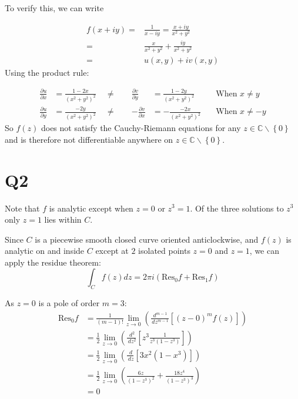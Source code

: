 \documentclass[a4paper, 11pt]{article}
\newcommand{\CC}{\mathbb{C}}
\def\set#1{\left\{ #1 \right\}}
\def\pp#1#2{\frac{\partial #1}{\partial #2}}
\def\dd#1#2{\frac{\,d#1}{\,d#2}}
\begin{document}
\begin{multicols}{2}
	To verify this, we can write

	\begin{align*}
		f(x+iy) = & \frac{1}{x-iy}
		=\frac{x+iy}{x^2+y^2}                           \\
		=         & \frac x{x^2+y^2}+\frac{iy}{x^2+y^2} \\
		=         & u(x,y)+iv(x,y)
	\end{align*}
	Using the product rule:

	\begin{alignat*}{6}
		\pp{u}{x}  & = \frac{1-2x}{(x^2+y^2)^2}      & \;\;\neq\;\;           &  &
		\pp{v}{y}  & = \frac{1-2y}{(x^2+y^2)^2}\quad & \text{When $x\neq y$}       \\
		\pp{u}{y}  & = \frac{-2y}{(x^2+y^2)^2}       & \;\;\neq\;\;           &  &
		-\pp{v}{x} & = -\frac{-2x}{(x^2+y^2)^2}\quad & \text{When $x\neq -y$}
	\end{alignat*}
	So $f(z)$ does not satisfy the Cauchy-Riemann equations for any $z\in\CC\backslash\set 0$ and is therefore not differentiable anywhere on $z\in\CC\backslash\set 0$.




	\section*{Q2}
	Note that $f$ is analytic except when $z=0$ or $z^3=1$. Of the three solutions to $z^3$ only $z=1$ lies within $C$.

	Since $C$ is a piecewise smooth closed curve oriented anticlockwise, and $f(z)$ is analytic on and inside $C$ except at $2$ isolated points $z=0$ and $z=1$, we can apply the residue theorem:
	$$\int_C f(z)dz=2\pi i (\text{Res}_0f + \text{Res}_1 f)$$

	As $z=0$ is a pole of order $m=3$:
	\begin{align*}
		\text{Res}_0 f & = \frac 1{(m-1)!}\lim_{z\to 0} \left( \dd{^{m-1}}{z^{m-1}} \left[ (z-0)^m f(z) \right] \right)      \\
		               & = \frac 1{2}\lim_{z\to 0} \left( \dd{^2}{z^2} \left[ z^3 \frac{1}{z^3(1-z^3)} \right] \right)       \\
		               & = \frac 1{2}\lim_{z\to 0} \left( \dd{}{z} \left[ 3x^2(1-x^3) \right]\right)                         \\
		               & = \frac 1{2}\lim_{z\to 0} \left( \frac{6z}{(1-z^3)^2} + \frac{18z^4}{\left( 1-z^3 \right)^3}\right) \\
		               & = 0
	\end{align*}


\end{multicols}
\end{document}

